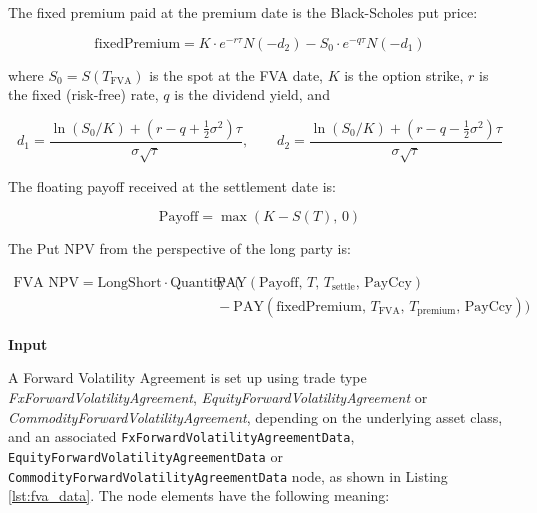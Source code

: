 {The fixed premium paid at the premium date is the Black-Scholes put price:

$$
\text{fixedPremium} = K \cdot e^{-r\tau} N(-d_2) - S_0 \cdot e^{-q\tau} N(-d_1)
$$

where $S_0 = S(T_{\text{FVA}})$ is the spot at the FVA date, $K$ is the option strike, $r$ is the fixed (risk-free)
rate, $q$ is the dividend yield, and

$$
d_1 = \frac{\ln(S_0/K) + (r - q + \frac{1}{2}\sigma^2)\tau}{\sigma\sqrt{\tau}}, \qquad
d_2 = \frac{\ln(S_0/K) + (r - q - \frac{1}{2}\sigma^2)\tau}{\sigma\sqrt{\tau}}
$$

The floating payoff received at the settlement date is:

$$
\text{Payoff} = \max(K - S(T),\, 0)
$$

The Put NPV from the perspective of the long party is:

\begin{equation}
\begin{split}
\text{FVA NPV}
= \text{LongShort} \cdot \text{Quantity} \cdot \Big(
&\text{PAY}(\text{Payoff},\, T,\, T_{\text{settle}},\, \text{PayCcy}) \\
&{}- \text{PAY}(\text{fixedPremium},\, T_{\text{FVA}},\, T_{\text{premium}},\, \text{PayCcy})
\Big)
\end{split}
\end{equation}

{\bf Input}}\fi

A Forward Volatility Agreement is set up using trade
type \emph{FxForwardVolatilityAgreement}, \emph{EquityForwardVolatilityAgreement} or \emph{CommodityForwardVolatilityAgreement},
depending on the underlying asset class, and an associated
\lstinline!FxForwardVolatilityAgreementData!, \lstinline!EquityForwardVolatilityAgreementData! or \lstinline!CommodityForwardVolatilityAgreementData! node,
as shown in Listing \ref{lst:fva_data}. The node elements have the following meaning:

